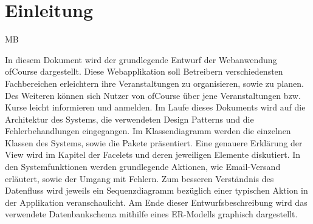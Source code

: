 \chapter{Einleitung}
\begin{tiny}
MB \\
\end{tiny}
In diesem Dokument wird der grundlegende Entwurf der Webanwendung \glqq ofCourse\grqq{} dargestellt. Diese Webapplikation soll Betreibern verschiedensten Fachbereichen erleichtern ihre Veranstaltungen zu organisieren, sowie zu planen. Des Weiteren können sich Nutzer von \glqq ofCourse\grqq{} über jene Veranstaltungen bzw. Kurse leicht informieren und anmelden. Im Laufe dieses Dokuments wird auf die Architektur des Systems, die verwendeten Design Patterns und die Fehlerbehandlungen eingegangen. Im Klassendiagramm werden die einzelnen Klassen des Systems, sowie die Pakete präsentiert. Eine genauere Erklärung der View wird im Kapitel der Facelets und deren jeweiligen Elemente diskutiert. In den Systemfunktionen werden grundlegende Aktionen, wie Email-Versand erläutert, sowie der Umgang mit Fehlern. Zum besseren Verständnis des Datenfluss wird jeweils ein Sequenzdiagramm bezüglich einer typischen Aktion in der Applikation veranschaulicht. 
Am Ende dieser Entwurfsbeschreibung wird das verwendete Datenbankschema mithilfe eines ER-Modells graphisch dargestellt.
